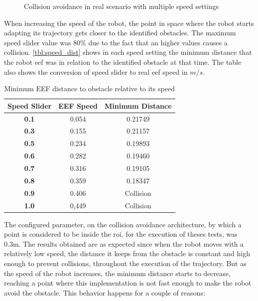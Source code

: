 \begin{figure}[h]
\begin{subfigure}{.5\linewidth}
    \end{subfigure}
    \caption{Collision avoidance in real scenario with multiple speed settings}
    \label{fig:real_col_speed}
\end{figure}

\par When increasing the speed of the robot, the point in space where the robot starts adapting its trajectory gets closer to the identified obstacles. The maximum speed slider value was 80\% due to the fact that an higher values causes a collision. \autoref{tbl:speed_dist} shows in each speed setting the minimum distance that the robot \ac{eef} was in relation to the identified obstacle at that time. The table also shows the conversion of speed slider to real \ac{eef} speed in $m/s$.

\begin{table}[h]
    \centering
    \begin{tabular}{|c|c|c|}
    \hline
    \textbf{Speed Slider} & \textbf{EEF Speed} & \textbf{Minimum Distance} \\ \hline
    \textbf{0.1}          & 0.054              & 0.21749                   \\ \hline
    \textbf{0.3}          & 0.155              & 0.21157                   \\ \hline
    \textbf{0.5}          & 0.234              & 0.19893                   \\ \hline
    \textbf{0.6}          & 0.282              & 0.19460                   \\ \hline
    \textbf{0.7}          & 0.316              & 0.19105                   \\ \hline
    \textbf{0.8}          & 0.359              & 0.18347                   \\ \hline
    \textbf{0.9}          & 0.406              & Collision                 \\ \hline
    \textbf{1.0}          & 0,449              & Collision                 \\ \hline
    \end{tabular}
    \caption{Minimum EEF distance to obstacle relative to its speed}
    \label{tbl:speed_dist}
\end{table}

\par The configured parameter, on the collision avoidance architecture, by which a point is considered to be inside the \ac{roi}, for the execution of theses tests, was 0.3m. The results obtained are as expected since when the robot moves with a relatively low speed, the distance it keeps from the obstacle is constant and high enough to prevent collisions, throughout the execution of the trajectory. But as the speed of the robot increases, the minimum distance starts to decrease, reaching a point where this implementation is not fast enough to make the robot avoid the obstacle. This behavior happens for a couple of reasons:

